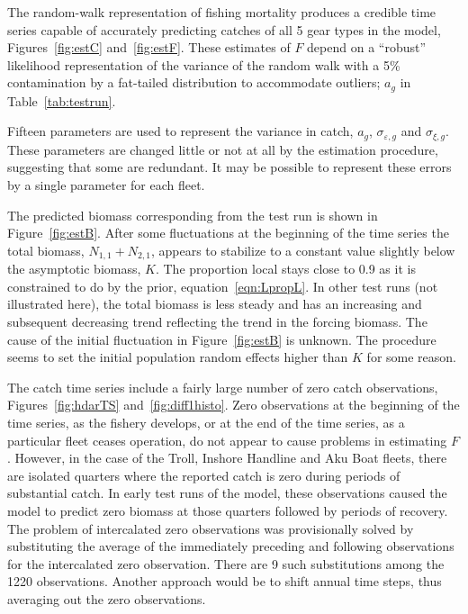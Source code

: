 \documentclass[12pt,letterpaper]{article}
\newcommand\Nsum{{N_{1,1}+N_{2,1}}}
\begin{document}
The random-walk representation of fishing mortality
produces a credible time series
capable of accurately predicting catches
of all 5 gear types in the model, 
Figures~\ref{fig:estC} and~\ref{fig:estF}.
These estimates of $F$ depend on a ``robust'' likelihood representation
of the variance of the random walk with a 5\% contamination by a fat-tailed
distribution to accommodate outliers; $a_g$ in Table~\ref{tab:testrun}.

Fifteen parameters are used to represent the variance in catch, $a_g$, 
$\sigma_{\varepsilon,g}$ and $\sigma_{\xi,g}$.
These parameters are changed little or not at all by the estimation
procedure, suggesting that some are redundant.
It may be possible to represent these errors by a single parameter for
each fleet.

The predicted biomass corresponding from the test run is shown in
Figure~\ref{fig:estB}. After some fluctuations at the beginning of
the time series the total biomass, $\Nsum$, appears to stabilize to a
constant value slightly below the asymptotic biomass, $K$. The
proportion local stays close to 0.9 as it is constrained to do by the
prior, equation~\ref{eqn:LpropL}.
In other test runs (not illustrated here), 
the total biomass is less steady and has an
increasing and subsequent decreasing trend reflecting the trend in the
forcing biomass.
The cause of the initial fluctuation in
Figure~\ref{fig:estB} is unknown. The procedure seems
to set the initial population random effects higher than $K$ for some
reason.

The catch time series include a fairly large number of zero catch
observations, Figures~\ref{fig:hdarTS} and~\ref{fig:diff1histo}.
Zero observations at the
beginning of the time series, as the fishery develops, or at the end of
the time series, as a particular fleet ceases operation, do not appear
to cause problems in estimating $F$.
However, in the case of the Troll, Inshore Handline and Aku Boat
fleets, there are isolated quarters where the reported catch is zero
during periods of substantial catch.
In early test runs of the model, these observations caused the model to predict
zero biomass at those quarters followed by periods of recovery. 
The problem of intercalated zero observations
was provisionally solved by substituting the average of the immediately
preceding and following observations for the intercalated zero
observation. There are 9 such substitutions among the 1220
observations. Another approach would be to shift annual time steps,
thus averaging out the zero observations.
\end{document}
